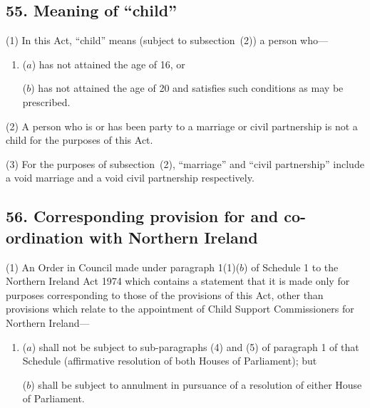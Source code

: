 \documentclass[12pt,a4paper]{article}
\begin{document}
%
%
%
%
%
%

\subsection{55. Meaning of ``child''}

(1) In this Act, “child” means (subject to subsection~(2)) a person who---
\begin{enumerate}\item[]
($a$) has not attained the age of 16, or

($b$) has not attained the age of 20 and satisfies such conditions as may be prescribed.
\end{enumerate}

(2)
A person who is or has been party to a marriage or civil partnership is not a child for the purposes of this Act.

(3)
For the purposes of subsection~(2), “marriage” and “civil partnership” include a void marriage and a void civil partnership respectively.


\subsection{56. Corresponding provision for and co-ordination with Northern Ireland}

(1) An Order in Council made under paragraph 1(1)($b$)  of Schedule 1 to the Northern Ireland Act 1974 which contains a statement that it is made only for purposes corresponding to those of the provisions of this Act, other than provisions which relate to the appointment of Child Support Commissioners for Northern Ireland—
\begin{enumerate}\item[]
($a$) shall not be subject to sub-paragraphs (4)  and (5)  of paragraph 1 of that Schedule (affirmative resolution of both Houses of Parliament); but

($b$) shall be subject to annulment in pursuance of a resolution of either House of Parliament.
\end{enumerate}
\end{document}
